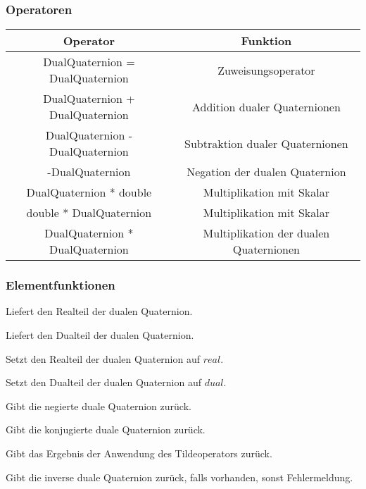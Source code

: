 \subsubsection{Operatoren}
\begin{tabular}{|c|c|}
\hline
Operator & Funktion\\ 
\hline
DualQuaternion = DualQuaternion & Zuweisungsoperator\\
\hline
DualQuaternion + DualQuaternion & Addition dualer Quaternionen\\
\hline
DualQuaternion - DualQuaternion & Subtraktion dualer Quaternionen\\
\hline
-DualQuaternion & Negation der dualen Quaternion\\
\hline
DualQuaternion * double & Multiplikation mit Skalar\\
\hline
double * DualQuaternion & Multiplikation mit Skalar\\
\hline
DualQuaternion * DualQuaternion & Multiplikation der dualen Quaternionen\\
\hline
\end{tabular}

\subsubsection{Elementfunktionen}
\descr
{
Liefert den Realteil der dualen Quaternion.
}

\descr
{
Liefert den Dualteil der dualen Quaternion.
}

\descr
{
Setzt den Realteil der dualen Quaternion auf $real$.
}

\descr
{
Setzt den Dualteil der dualen Quaternion auf $dual$.
}

\descr
{
Gibt die negierte duale Quaternion zurück.
}

\descr
{
Gibt die konjugierte duale Quaternion zurück.
}

\descr
{
Gibt das Ergebnis der Anwendung des Tildeoperators zurück.
}

\descr
{
Gibt die inverse duale Quaternion zurück, falls vorhanden, sonst Fehlermeldung.
}

